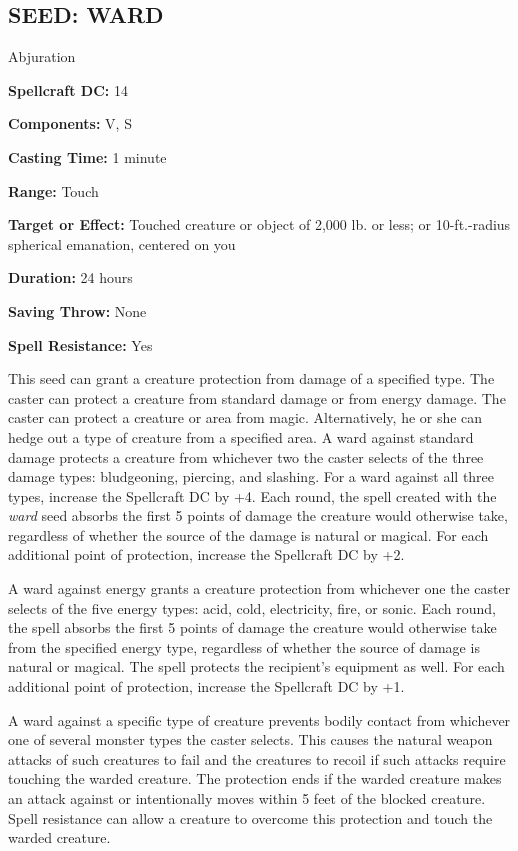 \documentclass{article}
\begin{document}
\vspace{12pt}
\subsection*{SEED: WARD }

Abjuration 

\textbf{Spellcraft DC:} 14 

\textbf{Components:} V, S 

\textbf{Casting Time:} 1 minute 

\textbf{Range:} Touch 

\textbf{Target or Effect:} Touched creature or object of 2,000 lb. or less; or 
10-ft.-radius spherical emanation, centered on you 

\textbf{Duration:} 24 hours 

\textbf{Saving Throw:} None 

\textbf{Spell Resistance:} Yes 

This seed can grant a creature protection from damage of a specified type. The 
caster can protect a creature from standard damage or from energy damage. The caster 
can protect a creature or area from magic. Alternatively, he or she can hedge out 
a type of creature from a specified area. A ward against standard damage protects 
a creature from whichever two the caster selects of the three damage types: bludgeoning, 
piercing, and slashing. For a ward against all three types, increase the Spellcraft 
DC by +4. Each round, the spell created with the \textit{ward }seed absorbs the 
first 5 points of damage the creature would otherwise take, regardless of whether 
the source of the damage is natural or magical. For each additional point of protection, 
increase the Spellcraft DC by +2. 

A ward against energy grants a creature protection from whichever one the caster 
selects of the five energy types: acid, cold, electricity, fire, or sonic. Each 
round, the spell absorbs the first 5 points of damage the creature would otherwise 
take from the specified energy type, regardless of whether the source of damage 
is natural or magical. The spell protects the recipient's equipment as well. For 
each additional point of protection, increase the Spellcraft DC by +1. 

A ward against a specific type of creature prevents bodily contact from whichever 
one of several monster types the caster selects. This causes the natural weapon 
attacks of such creatures to fail and the creatures to recoil if such attacks require 
touching the warded creature. The protection ends if the warded creature makes 
an attack against or intentionally moves within 5 feet of the blocked creature. 
Spell resistance can allow a creature to overcome this protection and touch the 
warded creature. 
\end{document}
